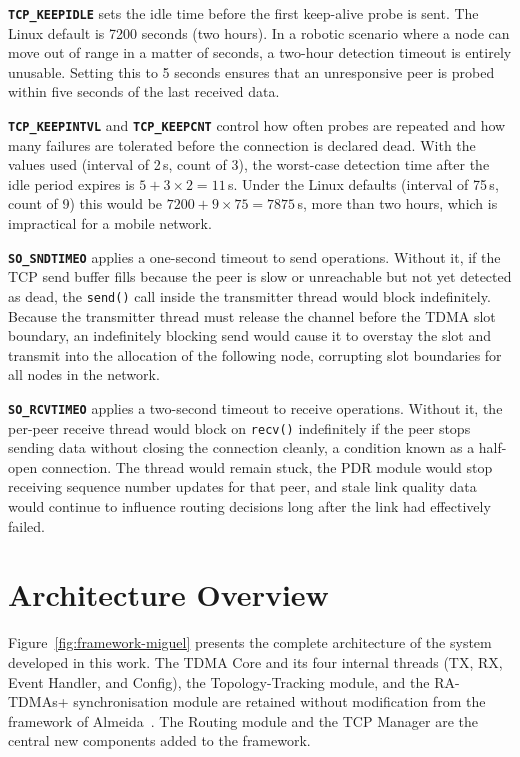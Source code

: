 \textbf{\texttt{TCP\_KEEPIDLE}} sets the idle time before the first keep-alive probe is sent.
The Linux default is 7200 seconds (two hours). In a robotic scenario where a node can move
out of range in a matter of seconds, a two-hour detection timeout is entirely unusable. Setting
this to 5 seconds ensures that an unresponsive peer is probed within five seconds of the last
received data.

\textbf{\texttt{TCP\_KEEPINTVL}} and \textbf{\texttt{TCP\_KEEPCNT}} control how often probes
are repeated and how many failures are tolerated before the connection is declared dead. With
the values used (interval of 2\,s, count of 3), the worst-case detection time after the idle
period expires is $5 + 3 \times 2 = 11$\,s. Under the Linux defaults (interval of 75\,s, count
of 9) this would be $7200 + 9 \times 75 = 7875$\,s, more than two hours, which is
impractical for a mobile network.

\textbf{\texttt{SO\_SNDTIMEO}} applies a one-second timeout to send operations. Without it,
if the TCP send buffer fills because the peer is slow or unreachable but not yet detected as
dead, the \texttt{send()} call inside the transmitter thread would block indefinitely. Because the
transmitter thread must release the channel before the TDMA slot boundary, an indefinitely
blocking send would cause it to overstay the slot and transmit into the allocation of the
following node, corrupting slot boundaries for all nodes in the network.

\textbf{\texttt{SO\_RCVTIMEO}} applies a two-second timeout to receive operations. Without
it, the per-peer receive thread would block on \texttt{recv()} indefinitely if the peer stops
sending data without closing the connection cleanly, a condition known as a half-open
connection. The thread would remain stuck, the PDR module would stop receiving sequence
number updates for that peer, and stale link quality data would continue to influence routing
decisions long after the link had effectively failed.


\section{Architecture Overview}
\label{sec:arch-overview}

Figure~\ref{fig:framework-miguel} presents the complete architecture of the system developed
in this work. The TDMA Core and its four internal threads (TX, RX, Event Handler, and
Config), the Topology-Tracking module, and the RA-TDMAs+ synchronisation module are
retained without modification from the framework of Almeida~\cite{almeida2023synchronization}.
The Routing module and the TCP Manager are the central new components added to the
framework.

